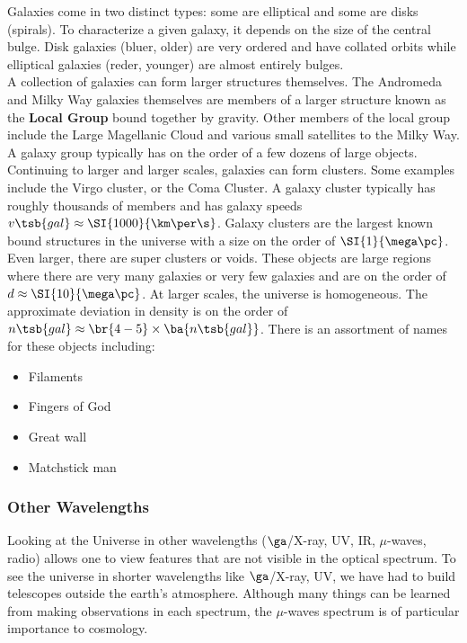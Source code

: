 \documentclass{article}
\begin{document}
Galaxies come in two distinct types: some are elliptical and some are disks (spirals). To characterize a given galaxy, it depends on the size of the central bulge. Disk galaxies (bluer, older) are very ordered and have collated orbits while elliptical galaxies (reder, younger) are almost entirely bulges. \\

A collection of galaxies can form larger structures themselves. The Andromeda and Milky Way galaxies themselves are members of a larger structure known as the \textbf{Local Group} bound together by gravity. Other members of the local group include the Large Magellanic Cloud and various small satellites to the Milky Way. A galaxy group typically has on the order of a few dozens of large objects. \\

Continuing to larger and larger scales, galaxies can form clusters. Some examples include the Virgo cluster, or the Coma Cluster. A galaxy cluster typically has roughly thousands of members and has galaxy speeds $v\tsb{gal} \approx \SI{1000}{\km \per \s}$. Galaxy clusters are the largest known bound structures in the universe with a size on the order of $\SI{1}{\mega\pc}$. \\

Even larger, there are super clusters or voids. These objects are large regions where there are very many galaxies or very few galaxies and are on the order of $d \approx \SI{10}{\mega\pc}$. At larger scales, the universe is homogeneous. The approximate deviation in density is on the order of $n\tsb{gal} \approx \br{4-5} \times \ba{n\tsb{gal}}$. There is an assortment of names for these objects including:
\begin{itemize}
    \item Filaments
    \item Fingers of God
    \item Great wall
    \item Matchstick man
\end{itemize}

\subsubsection{Other Wavelengths}

Looking at the Universe in other wavelengths ($\ga$/X-ray, UV, IR, $\mu$-waves, radio) allows one to view features that are not visible in the optical spectrum. To see the universe in shorter wavelengths like $\ga$/X-ray, UV, we have had to build telescopes outside the earth's atmosphere. Although many things can be learned from making observations in each spectrum, the $\mu$-waves spectrum is of particular importance to cosmology. \\
\end{document}
